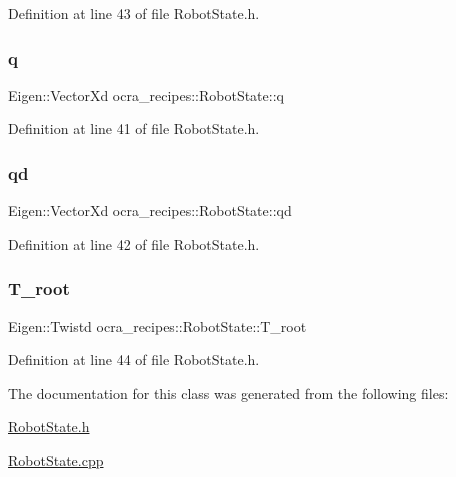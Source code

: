 Definition at line 43 of file Robot\+State.\+h.

\hypertarget{classocra__recipes_1_1RobotState_aa442f30f43e33d4c5f5d007640d8aaa0}{}\label{classocra__recipes_1_1RobotState_aa442f30f43e33d4c5f5d007640d8aaa0} 
\subsubsection{\texorpdfstring{q}{q}}
{\footnotesize\ttfamily Eigen\+::\+Vector\+Xd ocra\+\_\+recipes\+::\+Robot\+State\+::q}



Definition at line 41 of file Robot\+State.\+h.

\hypertarget{classocra__recipes_1_1RobotState_ac45331562cde3f3f67a9f40d71e47c6a}{}\label{classocra__recipes_1_1RobotState_ac45331562cde3f3f67a9f40d71e47c6a} 
\subsubsection{\texorpdfstring{qd}{qd}}
{\footnotesize\ttfamily Eigen\+::\+Vector\+Xd ocra\+\_\+recipes\+::\+Robot\+State\+::qd}



Definition at line 42 of file Robot\+State.\+h.

\hypertarget{classocra__recipes_1_1RobotState_ae71e2d5ff8976c859921e06a4f35bf25}{}\label{classocra__recipes_1_1RobotState_ae71e2d5ff8976c859921e06a4f35bf25} 
\subsubsection{\texorpdfstring{T\+\_\+root}{T\_root}}
{\footnotesize\ttfamily Eigen\+::\+Twistd ocra\+\_\+recipes\+::\+Robot\+State\+::\+T\+\_\+root}



Definition at line 44 of file Robot\+State.\+h.



The documentation for this class was generated from the following files\+:\begin{DoxyCompactItemize}
\item 
\hyperlink{RobotState_8h}{Robot\+State.\+h}\item 
\hyperlink{RobotState_8cpp}{Robot\+State.\+cpp}\end{DoxyCompactItemize}
